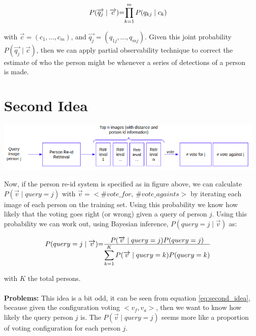 \documentclass[10pt,a4paper,final]{article}
\begin{document}
\begin{equation}
	\label{eq:joint_first_idea}
	\begin{tabular}{r@{=}l}
	$P(\overrightarrow{q_j} \mid \overrightarrow{c})$ & $\displaystyle \prod_{k=1}^{m} P(q_{kj} \mid c_{k})$ \\ 
	\end{tabular}
\end{equation}

\noindent with $\overrightarrow{c} = (c_{1}, \ldots, c_{m})$, and $\overrightarrow{q_j} = (q_{1j}, \ldots, q_{mj})$. Given this joint probability $P(\overrightarrow{q_j} \mid \overrightarrow{c})$, then we can apply partial observability technique to correct the estimate of who the person might be whenever a series of detections of a person is made.

\section{Second Idea}

\includegraphics[width=\textwidth]{figures/second_idea.png}

Now, if the person re-id system is specified as in figure above, we can calculate $P(\overrightarrow{v} \mid query = j)$ with $\overrightarrow{v} = <\#vote\_for, ~\#vote\_againts>$ by iterating each image of each person on the training set. Using this probability we know how likely that the voting goes right (or wrong) given a query of person $j$. Using this probability we can work out, using Bayesian inference, $P(query=j \mid \overrightarrow{v})$ as:

\begin{equation}
	\label{eq:second_idea}
	\begin{tabular}{r@{=}l}
		$P(query=j \mid \overrightarrow{v})$ & $\frac{\displaystyle P(\overrightarrow{v} \mid query = j) P(query=j)}{\displaystyle\sum_{k=1}^{K} P(\overrightarrow{v} \mid query = k) P(query=k)}$ \\ 
	\end{tabular}
\end{equation}

\noindent with $K$ the total persons.
\\
\\
\noindent \textbf{Problems:}
This idea is a bit odd, it can be seen from equation \ref{eq:second_idea}, because given the configuration voting $<v_f, v_a>$, then we want to know how likely the query person $j$ is. The $P(\overrightarrow{v} \mid query = j)$ seems more like a proportion of voting configuration for each person $j$.
\end{document}
